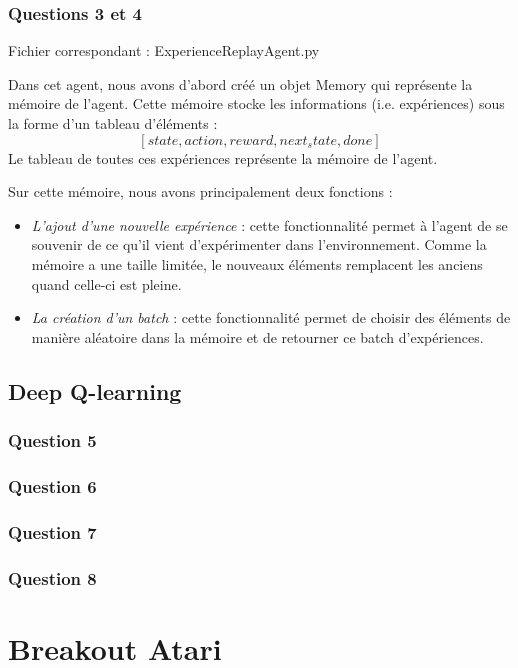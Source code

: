 \documentclass[10pt,a4paper]{article}
\begin{document}
\subsubsection{Questions 3 et 4}

Fichier correspondant : ExperienceReplayAgent.py

Dans cet agent, nous avons d'abord créé un objet Memory qui représente la mémoire de l'agent. Cette mémoire stocke les informations (i.e. expériences) sous la forme d'un tableau d'éléments : 
$$ [state, action, reward, next_state, done] $$
Le tableau de toutes ces expériences représente la mémoire de l'agent.

Sur cette mémoire, nous avons principalement deux fonctions :
\begin{itemize}
	\item \textit{L'ajout d'une nouvelle expérience} : cette fonctionnalité permet à l'agent de se souvenir de ce qu'il vient d'expérimenter dans l'environnement. Comme la mémoire a une taille limitée, le nouveaux éléments remplacent les anciens quand celle-ci est pleine.
	\item \textit{La création d'un batch} : cette fonctionnalité permet de choisir des éléments de manière aléatoire dans la mémoire et de retourner ce batch d'expériences.
\end{itemize}

\subsection{Deep Q-learning}

\subsubsection{Question 5}

\subsubsection{Question 6}

\subsubsection{Question 7}

\subsubsection{Question 8}

\section{Breakout Atari}
\end{document}
